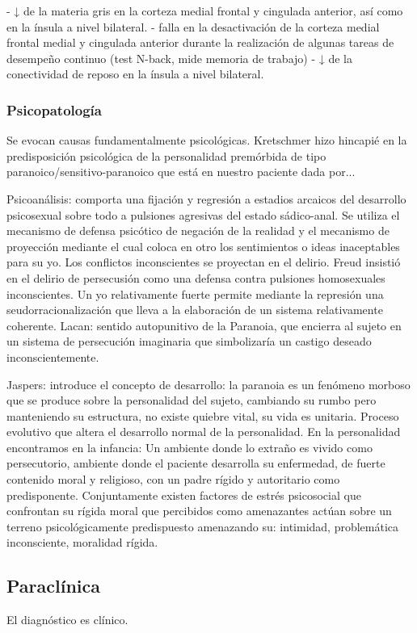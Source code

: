 \documentclass{scrbook}
\begin{document}
- ↓ de la materia gris en la corteza medial frontal y cingulada anterior, así como en la ínsula a nivel bilateral.
- falla en la desactivación de la corteza medial frontal medial y cingulada anterior durante la realización de algunas tareas de desempeño continuo (test N-back, mide memoria de trabajo)
- ↓ de la conectividad de reposo en la ínsula a nivel bilateral.
\subsubsection*{Psicopatología}
Se evocan causas fundamentalmente psicológicas. Kretschmer hizo hincapié en la predisposición psicológica de la personalidad premórbida de tipo paranoico/sensitivo-paranoico que está en nuestro paciente dada por... 

Psicoanálisis: comporta una fijación y regresión a estadios arcaicos del desarrollo psicosexual sobre todo a pulsiones agresivas del estado sádico-anal. Se utiliza el mecanismo de defensa psicótico de negación de la realidad y el mecanismo de proyección mediante el cual coloca en otro los sentimientos o ideas inaceptables para su yo. Los conflictos inconscientes se proyectan en el delirio. Freud insistió en el delirio de persecusión como una defensa contra pulsiones homosexuales inconscientes. Un yo relativamente fuerte permite mediante la represión una seudorracionalización que lleva a la elaboración de un sistema relativamente coherente. Lacan: sentido autopunitivo de la Paranoia, que encierra al sujeto en un sistema de persecución imaginaria que simbolizaría un castigo deseado inconscientemente. 

Jaspers: introduce el concepto de desarrollo: la paranoia es un fenómeno morboso que se produce sobre la personalidad del sujeto, cambiando su rumbo pero manteniendo su estructura, no existe quiebre vital, su vida es unitaria. Proceso evolutivo que altera el desarrollo normal de la personalidad. En la personalidad encontramos en la infancia: Un ambiente donde lo extraño es vivido como persecutorio, ambiente donde el paciente desarrolla su enfermedad, de fuerte contenido moral y religioso, con un padre rígido y autoritario como predisponente. Conjuntamente existen factores de estrés psicosocial que confrontan su rígida moral que percibidos como amenazantes actúan sobre un terreno psicológicamente predispuesto amenazando su: intimidad, problemática inconsciente, moralidad rígida.
\subsection*{Paraclínica}
El diagnóstico es clínico.
\end{document}

